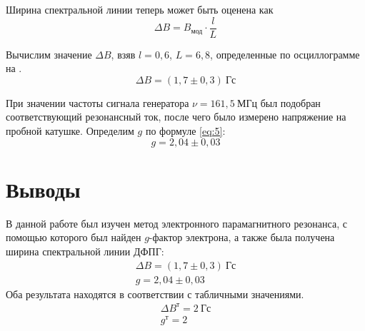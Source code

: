 \documentclass[a4paper, 12pt]{article}
\begin{document}
Ширина спектральной линии теперь может быть
оценена как 
\begin{equation}
    \Delta B = B_\text{мод} \cdot \frac{l}{L}
    \label{eq:7}
\end{equation}

Вычислим значение $\Delta B$, взяв $l = 0,6$, $L = 6,8$, определенные
по осциллограмме на .
\[
    \Delta B = (1,7 \pm 0,3)\: \text{Гс}
\]


При значении частоты сигнала генератора $\nu = 161,5\: \text{МГц}$
был подобран соответствующий резонансный 
ток, после чего 
было измерено напряжение на пробной катушке. Определим $g$ по формуле
\eqref{eq:5}:
\[
    g = 2,04 \pm 0,03
\]







\section{Выводы}
В данной работе был изучен метод электронного парамагнитного
резонанса, с помощью которого был найден $g$-фактор электрона, а также
была получена ширина спектральной линии ДФПГ:
\begin{equation*}
    \begin{gathered}
    \Delta B = (1,7 \pm 0,3)\: \text{Гс}\\
    g = 2,04 \pm 0,03
    \end{gathered}
\end{equation*}
Оба результата находятся
в соответствии с табличными значениями.
\begin{equation*}
    \begin{gathered}
    \Delta B^\text{т} = 2\: \text{Гс}\\
    g^\text{т} = 2
    \end{gathered}
\end{equation*}
\end{document}
